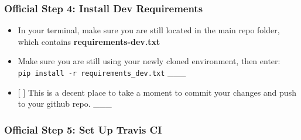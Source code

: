 \documentclass[11pt]{article}
\begin{document}
    \hypertarget{official-step-4-install-dev-requirements}{%
\subsubsection{Official Step 4: Install Dev
Requirements}\label{official-step-4-install-dev-requirements}}

\begin{itemize}
\item
  In your terminal, make sure you are still located in the main repo
  folder, which contains \textbf{requirements-dev.txt}
\item
  Make sure you are still using your newly cloned environment, then
  enter: \texttt{pip\ install\ -r\ requirements\_dev.txt} \_\_\_
\item
  {[} {]} This is a decent place to take a moment to commit your changes
  and push to your github repo. \_\_\_
\end{itemize}

\hypertarget{official-step-5-set-up-travis-ci}{%
\subsubsection{Official Step 5: Set Up Travis
CI}\label{official-step-5-set-up-travis-ci}}
\end{document}
